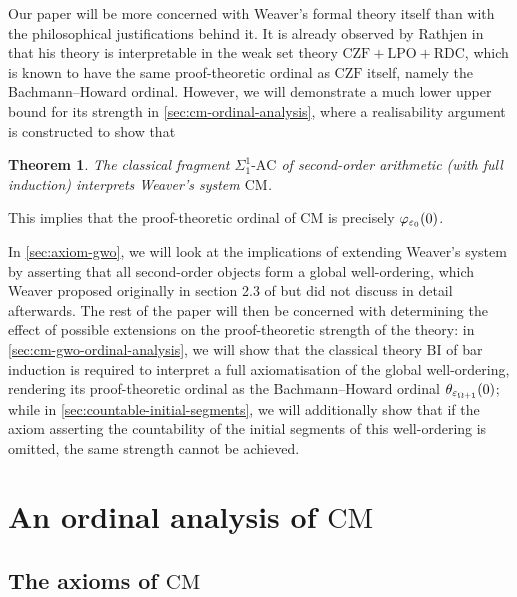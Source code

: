 \documentclass[11pt]{article}
\theoremstyle{plain}
\newtheorem{theorem}{Theorem}[section]
\theoremstyle{definition}
\begin{document}
Our paper will be more concerned with Weaver's formal theory itself than with the philosophical justifications behind it. It is already observed by Rathjen in \cite{rathjen23-cst} that his theory is interpretable in the weak set theory $\mathrm{CZF} + \mathrm{LPO} + \mathrm{RDC}$, which is known to have the same proof-theoretic ordinal as $\mathrm{CZF}$ itself, namely the Bachmann--Howard ordinal. However, we will demonstrate a much lower upper bound for its strength in \autoref{sec:cm-ordinal-analysis}, where a realisability argument is constructed to show that

\newcommand{\AC}{\text{$\Sigma^1_1$-$\mathrm{AC}$}}

\begin{theorem}
    The classical fragment $\AC$ of second-order arithmetic (with full induction) interprets Weaver's system $\mathrm{CM}$.
\end{theorem}

This implies that the proof-theoretic ordinal of $\mathrm{CM}$ is precisely $\varphi_{\varepsilon_0}\mleft(0\mright)$.

In \autoref{sec:axiom-gwo}, we will look at the implications of extending Weaver's system by asserting that all second-order objects form a global well-ordering, which Weaver proposed originally in section 2.3 of \cite{weaver09-cm} but did not discuss in detail afterwards. The rest of the paper will then be concerned with determining the effect of possible extensions on the proof-theoretic strength of the theory: in \autoref{sec:cm-gwo-ordinal-analysis}, we will show that the classical theory $\mathrm{BI}$ of bar induction is required to interpret a full axiomatisation of the global well-ordering, rendering its proof-theoretic ordinal as the Bachmann--Howard ordinal $\theta_{\varepsilon_{\Omega + 1}}\mleft(0\mright)$; while in \autoref{sec:countable-initial-segments}, we will additionally show that if the axiom asserting the countability of the initial segments of this well-ordering is omitted, the same strength cannot be achieved.

\section{An ordinal analysis of \texorpdfstring{$\mathrm{CM}$}{CM}}
\label{sec:cm-ordinal-analysis}

\subsection{The axioms of \texorpdfstring{$\mathrm{CM}$}{CM}}
\label{subsec:cm-axioms}
\end{document}
